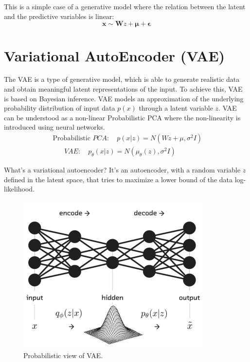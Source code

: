 \documentclass[5p,sort&compress]{elsarticle}
\begin{document}
This is a simple case of a generative model where the relation between the latent and the predictive variables is linear:
\begin{equation}
\boldsymbol{x} \sim \boldsymbol{W} z+\boldsymbol{\mu}+\boldsymbol{\epsilon}
\end{equation}


\section{Variational AutoEncoder (VAE)}

The VAE is a type of generative model, which is able to generate realistic data and obtain meaningful latent representations of the input. To achieve this, VAE is based on Bayesian inference. VAE models an approximation of the underlying probability distribution of input data $p(x)$ through a latent variable $z$. VAE can be understood as a non-linear Probabilistic PCA where the non-linearity is introduced using neural networks.
\begin{equation}
\begin{aligned}
\text { Probabilistic } P C A: \quad p(x | z)=N\left(W z+\mu, \sigma^{2} I\right) \\ {\qquad V A E: \quad p_{\theta}(x | z)=N\left(\mu_{\theta}(z), \sigma^{2} I\right)}
\end{aligned}
\end{equation}

What's a variational autoencoder? It's an autoencoder, with a random variable $z$ defined in the latent space, that tries to maximize a lower bound of the data log-likelihood. 

\begin{figure}[ht]
     \centering
     \includegraphics[width = 0.8\linewidth]{figure/probabilistic_vae.png}
     \caption{Probabilistic view of VAE.}
     \label{fig:vae}
\end{figure}
\end{document}
